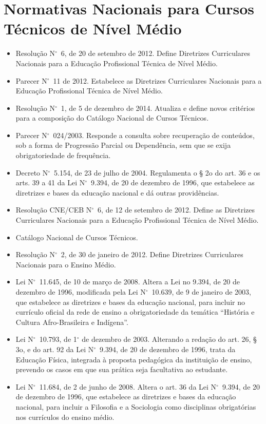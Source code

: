 \documentclass[
	12pt,				%
	openright,			%
	twoside,			%
	a4paper,			%
	chapter=TITLE,		%
	english,			%
	french,				%
	spanish,			%
	brazil,				%
	]{abntex2}
\newcommand{\n}{N$^\circ$}
\begin{document}
\section{Normativas Nacionais para Cursos Técnicos de Nível Médio}

\begin{itemize}
    \item Resolução \n~6, de 20 de setembro de 2012. Define Diretrizes Curriculares Nacionais para a Educação Profissional Técnica de Nível Médio.
    \item  Parecer \n~11 de 2012. Estabelece as Diretrizes Curriculares Nacionais para a Educação Profissional Técnica de Nível Médio.
    \item Resolução \n~1, de 5 de dezembro de 2014. Atualiza e define novos critérios para a composição do Catálogo Nacional de Cursos Técnicos.
    \item  Parecer \n~024/2003. Responde a consulta sobre recuperação de conteúdos, sob a forma de Progressão Parcial ou Dependência, sem que se exija obrigatoriedade de frequência.
    \item  Decreto \n~5.154, de 23 de julho de 2004. Regulamenta o § 2o do art. 36 e os arts. 39 a 41 da Lei \n~9.394, de 20 de dezembro de 1996, que estabelece as diretrizes e bases da educação nacional e dá outras providências.
    \item Resolução CNE/CEB \n~6, de 12 de setembro de 2012. Define as Diretrizes Curriculares Nacionais para a Educação Profissional Técnica de Nível Médio.
    \item  Catálogo Nacional de Cursos Técnicos.
    \item  Resolução \n~2, de 30 de janeiro de 2012. Define Diretrizes Curriculares Nacionais para o Ensino Médio.
    \item  Lei \n~11.645, de 10 de março de 2008. Altera a Lei no 9.394, de 20 de dezembro de 1996, modificada pela Lei \n~10.639, de 9 de janeiro de 2003, que estabelece as diretrizes e bases da educação nacional, para incluir no currículo oficial da rede de ensino a obrigatoriedade da temática “História e Cultura Afro-Brasileira e Indígena”.
    \item  Lei \n~10.793, de 1$^\circ$ de dezembro de 2003. Alterando a redação do art. 26, § 3o, e do art. 92 da Lei \n~9.394, de 20 de dezembro de 1996, trata da Educação Física, integrada à proposta pedagógica da instituição de ensino, prevendo os casos em que sua prática seja facultativa ao estudante.
    \item  Lei \n~11.684, de 2 de junho de 2008. Altera o art. 36 da Lei \n~9.394, de 20 de dezembro de 1996, que estabelece as diretrizes e bases da educação nacional, para incluir a Filosofia e a Sociologia como disciplinas obrigatórias nos currículos do ensino médio.

\end{itemize}
\end{document}
